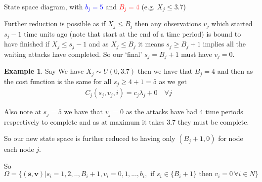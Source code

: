 \documentclass[a4paper,10pt]{article}
\theoremstyle{definition}
\theoremstyle{definition}
\newtheorem{example}[theorem]{Example}
\theoremstyle{remark}
\theoremstyle{definition}
\begin{document}
\begin{myfigure}
\begin{center}
\end{center}
\caption{State space diagram, with \textcolor{blue}{$b_{j}=5$} and \textcolor{red}{$B_{j}=4$} (e.g. $X_{j} \leq 3.7$)}
\end{myfigure}

Further reduction is possible as if $X_{j} \leq B_{j}$ then any observations $v_{j}$ which started $s_{j}-1$ time units ago (note that start at the end of a time period) is bound to have finished if $X_{j} \leq s_{j}-1$ and as $X_{j} \leq B_{j}$ it means $s_{j} \geq B_{j}+1$ implies all the waiting attacks have completed. So our `final' $s_{j}=B_{j}+1$ must have $v_{j}=0$.

\begin{example}
Say We have $X_{j} \sim U(0,3.7)$ then we have that $B_{j}=4$ and then as the cost function is the same for all $s_{j} \geq 4+1=5$ as we get
\begin{align*}
C_{j}(s_{j},v_{j},i)= c_{j} \lambda_{j}+0 \quad \forall j
\end{align*}

Also note at $s_{j}=5$ we have that $v_{j}=0$ as the attacks have had $4$ time periods respectively to complete and as at maximum it takes $3.7$ they must be complete.
\end{example}

So our new state space is further reduced to having only $(B_{j}+1,0)$ for node each node $j$.

So $\Omega= \{ (\bm{s},\bm{v}) | s_{i}=1,2,..,B_{i}+1 , v_{i}=0,1,...,b_{i} , \text{ if } s_{i} \in \{B_{i}+1 \} \text{ then } v_{i}=0 \, \forall i \in N \}$
\end{document}
